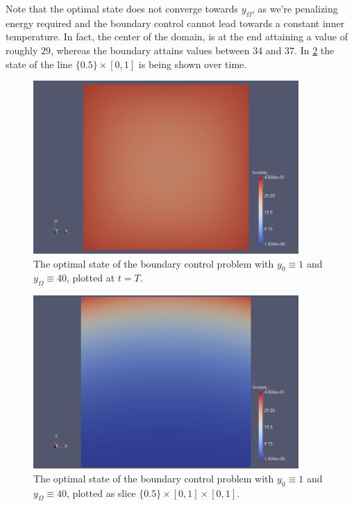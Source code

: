 \documentclass[../thesis.tex]{subfiles}
\begin{document}
Note that the optimal state does not converge towards $y_\Omega$, as we're penalizing energy required and the boundary control cannot lead towards a constant inner temperature. In fact, the center of the domain, is at the end attaining a value of roughly $29$, whereas the boundary attains values between $34$ and $37$.
In \cref{fig:boundary-const-y-cut} the state of the line $\{ 0.5 \} \times [0, 1]$ is being shown over time.
\begin{figure}[htpb]
\centering
\includegraphics[width=0.9\textwidth]{Images/boundary-const-y-endtime.png}
\caption{The optimal state of the boundary control problem with $y_0 \equiv 1$ and $y_\Omega \equiv 40$, plotted at $t = T$.}
\label{fig:boundary-const-y-endtime}
\end{figure}
\begin{figure}[htpb]
\centering
\includegraphics[width=0.9\textwidth]{Images/boundary-const-y-cut.png}
\caption{The optimal state of the boundary control problem with $y_0 \equiv 1$ and $y_\Omega \equiv 40$, plotted as slice $\{ 0.5 \} \times [0, 1] \times [0, 1]$.}
\label{fig:boundary-const-y-cut}
\end{figure}
\FloatBarrier
\end{document}
